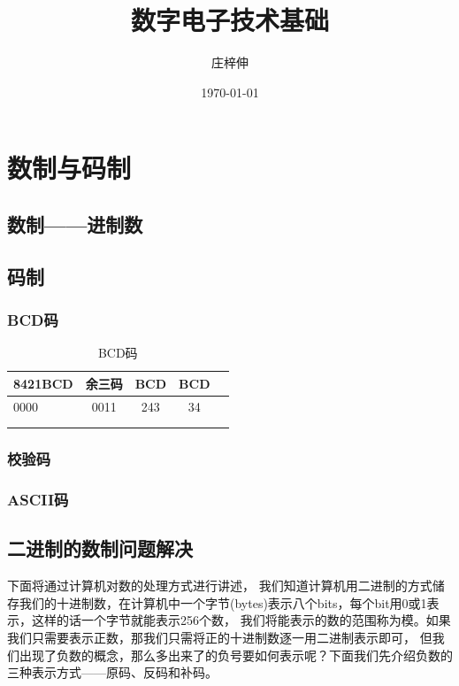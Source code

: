 \documentclass[UTF8]{article}
\title{\heiti 数字电子技术基础}
\author{\heiti 庄梓伸}
\date{\heiti \today}
\begin{document}
\maketitle
\newpage
\begin{center}
\tableofcontents
\end{center}
\setcounter{page}{0}
\thispagestyle{empty}

\newpage
\section{数制与码制}

\subsection{数制——进制数}

\subsection{码制}

\subsubsection{BCD码}

    \begin{table}[H] %
        \centering
        \begin{tabular}{|l|c|c|c|p{2.5cm}}
        \hline
        8421BCD & 余三码  & BCD & BCD\\
        \hline
        0000    & 0011 & 243 & 34\\
        \hline
                &      &     &\\
        \hline
                &      &     &\\
        \hline
        \end{tabular}
        \caption{BCD码}
        \label{tab:my-table}
    \end{table}

\subsubsection{校验码}

\subsubsection{ASCII码}

\subsection{二进制的数制问题解决}
下面将通过计算机对数的处理方式进行讲述，
我们知道计算机用二进制的方式储存我们的十进制数，在计算机中一个字节(bytes)表示八个bits，每个bit用0或1表示，这样的话一个字节就能表示256个数，
我们将能表示的数的范围称为{\heiti 模}。如果我们只需要表示正数，那我们只需将正的十进制数逐一用二进制表示即可，
但我们出现了负数的概念，那么多出来了的负号要如何表示呢？下面我们先介绍负数的三种表示方式——原码、反码和补码。
\end{document}
